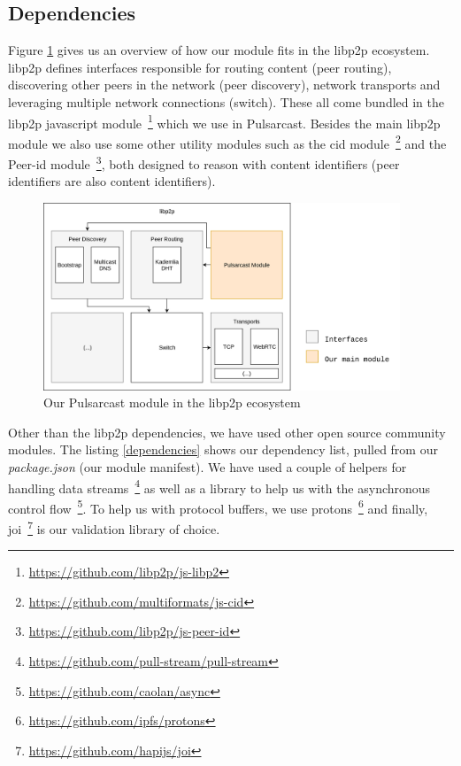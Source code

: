 \subsection{Dependencies}\label{subsec:dependencies}

Figure \ref{fig:pulsarcast-in-libp2p} gives us an overview of how our module
fits in the libp2p ecosystem. libp2p defines interfaces responsible for routing
content (peer routing), discovering other peers in the network (peer
discovery), network transports and leveraging multiple network connections
(switch). These all come bundled in the libp2p javascript
module~\footnote{\url{https://github.com/libp2p/js-libp2}} which we use in
Pulsarcast. Besides the main libp2p module we also use some other utility
modules such as the \acrshort{cid}
module~\footnote{\url{https://github.com/multiformats/js-cid}} and the Peer-id
module~\footnote{\url{https://github.com/libp2p/js-peer-id}}, both designed to reason
with content identifiers (peer identifiers are also content identifiers). 

\begin{figure}[hb!]
  \centering
  \includegraphics[width=0.95\textwidth]{img/pulsarcast-in-libp2p.png}
  \caption{Our Pulsarcast module in the libp2p ecosystem}
  \label{fig:pulsarcast-in-libp2p}
\end{figure}

Other than the libp2p dependencies, we have used other open source community
modules. The listing \ref{dependencies} shows our dependency list, pulled from our \emph{package.json} (our module manifest). We have used a couple of helpers
for handling data streams~\footnote{\url{https://github.com/pull-stream/pull-stream}}
as well as a library to help us with the asynchronous control
flow~\footnote{\url{https://github.com/caolan/async}}. To help us with protocol
buffers, we use protons~\footnote{\url{https://github.com/ipfs/protons}} and finally,
joi~\footnote{\url{https://github.com/hapijs/joi}} is our validation library of
choice.

